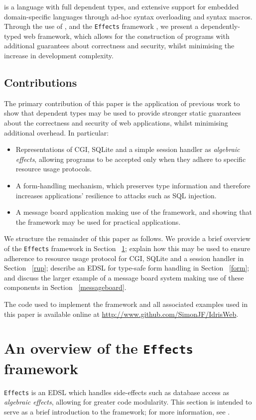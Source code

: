 \documentclass[preprint]{sigplanconf}
\begin{document}
\idris{} \cite{brady2011idris} is a language with full dependent types, and extensive support for embedded domain-specific languages through ad-hoc syntax overloading and syntax macros. Through the use of \idris{}, and the \texttt{Effects} framework \cite{brady:effects}, we present a dependently-typed web framework, which allows for the construction of programs with additional guarantees about correctness and security, whilst minimising the increase in development complexity. 

\subsection{Contributions}
The primary contribution of this paper is the application of previous work to show that dependent types may be used to provide stronger static guarantees about the correctness and security of web applications, whilst minimising additional overhead. In particular:

\begin{itemize}
\item Representations of CGI, SQLite and a simple session handler as \textit{algebraic effects}, allowing programs to be accepted only when they adhere to specific resource usage protocols.
\item A form-handling mechanism, which preserves type information and therefore increases applications' resilience to attacks such as SQL injection.
\item A message board application making use of the framework, and showing that the framework may be used for practical applications.
\end{itemize}

We structure the remainder of this paper as follows. We provide a brief overview of the \texttt{Effects} framework in Section ~\ref{effects}; explain how this may be used to ensure adherence to resource usage protocol for CGI, SQLite and a session handler in Section ~\ref{rup}; describe an EDSL for type-safe form handling in Section ~\ref{form}; and discuss the larger example of a message board system making use of these components in Section ~\ref{messageboard}.

The code used to implement the framework and all associated examples used in this paper is available online at \url{http://www.github.com/SimonJF/IdrisWeb}.

\section{An overview of the \texttt{Effects} framework}
\label{effects}
\texttt{Effects} is an EDSL which handles side-effects such as database access as \textit{algebraic effects}, allowing for greater code modularity. This section is intended to serve as a brief introduction to the framework; for more information, see \cite{brady:effects}.
\end{document}
